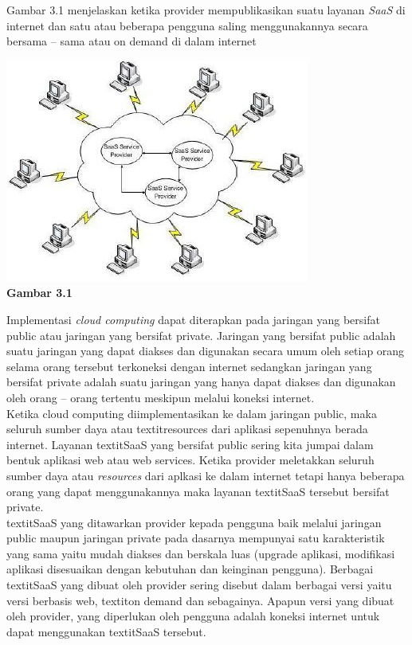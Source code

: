 Gambar 3.1 menjelaskan ketika provider mempublikasikan suatu layanan \textit{SaaS} di internet dan satu atau beberapa pengguna saling menggunakannya secara bersama – sama atau on demand di dalam internet
\begin{center}
\includegraphics[scale=1]{Gambar31.jpg} \\
\textbf{Gambar 3.1}
\end{center}
\tab Implementasi \textit{cloud computing} dapat diterapkan pada jaringan yang bersifat public atau jaringan yang bersifat private. Jaringan yang bersifat public adalah suatu jaringan yang dapat diakses dan digunakan secara umum oleh setiap orang selama orang tersebut terkoneksi dengan internet sedangkan jaringan yang bersifat private adalah suatu jaringan yang hanya dapat diakses dan digunakan oleh orang – orang tertentu meskipun melalui koneksi internet.\\
\tab Ketika cloud computing diimplementasikan ke dalam jaringan public, maka seluruh sumber daya atau textit{resources} dari aplikasi sepenuhnya berada internet. Layanan textit{SaaS} yang bersifat public sering kita jumpai dalam bentuk aplikasi web atau web services. Ketika provider meletakkan seluruh sumber daya atau \textit{resources} dari aplkasi ke dalam internet tetapi hanya beberapa orang yang dapat menggunakannya maka layanan textit{SaaS} tersebut bersifat private.\\
\tab textit{SaaS} yang ditawarkan provider kepada pengguna baik melalui jaringan public maupun jaringan private pada dasarnya mempunyai satu karakteristik yang sama yaitu mudah diakses dan berskala luas (upgrade aplikasi, modifikasi aplikasi disesuaikan dengan kebutuhan dan keinginan pengguna).
\tab Berbagai textit{SaaS} yang dibuat oleh provider sering disebut dalam berbagai versi yaitu versi berbasis web, textit{on demand} dan sebagainya. Apapun versi yang dibuat oleh provider, yang diperlukan oleh pengguna adalah koneksi internet untuk dapat menggunakan textit{SaaS} tersebut.
